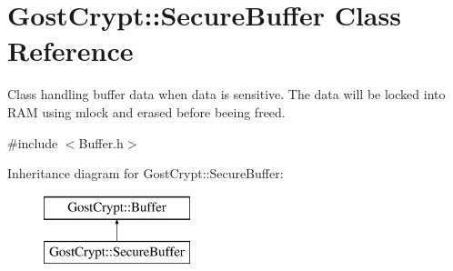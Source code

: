 \hypertarget{class_gost_crypt_1_1_secure_buffer}{}\section{Gost\+Crypt\+:\+:Secure\+Buffer Class Reference}
\label{class_gost_crypt_1_1_secure_buffer}


Class handling buffer data when data is sensitive. The data will be locked into R\+AM using mlock and erased before beeing freed.  




{\ttfamily \#include $<$Buffer.\+h$>$}

Inheritance diagram for Gost\+Crypt\+:\+:Secure\+Buffer\+:\begin{figure}[H]
\begin{center}
\leavevmode
\includegraphics[height=2.000000cm]{class_gost_crypt_1_1_secure_buffer}
\end{center}
\end{figure}
